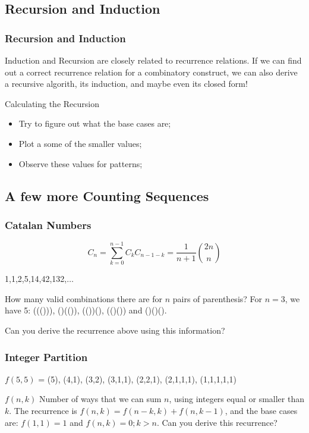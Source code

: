 \documentclass{beamer}
\begin{document}
\subsection{Recursion and Induction}
\begin{frame}
  \frametitle{Recursion and Induction}
  \begin{block}{}
    {\small
      Induction and Recursion are closely related to recurrence
      relations. If we can find out a correct recurrence relation for a
      combinatory construct, we can also derive a recursive algorith,
      its induction, and maybe even its closed form!
    }
  \end{block}
  \medskip
  \begin{block}{Calculating the Recursion}
    \begin{itemize}
    \item Try to figure out what the base cases are;
    \item Plot a some of the smaller values;
    \item Observe these values for patterns;
    \end{itemize}
  \end{block}

\end{frame}

\subsection{A few more Counting Sequences}

\begin{frame}
  \frametitle{Catalan Numbers}
  \begin{equation*}
    C_n = \sum_{k=0}^{n-1} C_kC_{n-1-k}=\frac{1}{n+1}\binom{2n}{n}
  \end{equation*}
  \begin{block}{}
    1,1,2,5,14,42,132,$\ldots$
  \end{block}
  \begin{block}{}
    {\small
    How many valid combinations there are for $n$ pairs of
    parenthesis? For $n = 3$, we have 5: ((())), ()(()), (())(),
    (()()) and ()()().
    \medskip
    
    Can you derive the recurrence above using this information?
    }
  \end{block}
\end{frame}

\begin{frame}
  \frametitle{Integer Partition}
  \begin{block}{}
    $f(5,5)$ = (5), (4,1), (3,2), (3,1,1), (2,2,1), (2,1,1,1), (1,1,1,1,1)
  \end{block}
  \begin{block}{}
    $f(n,k)$ Number of ways that we can sum $n$, using integers equal
    or smaller than $k$. The recurrence is $f(n,k) =
    f(n-k,k)+f(n,k-1)$, and the base cases are: $f(1,1) = 1$ and
    $f(n,k) = 0; k > n$. Can you derive this recurrence?    
  \end{block}
\end{frame}
\end{document}
